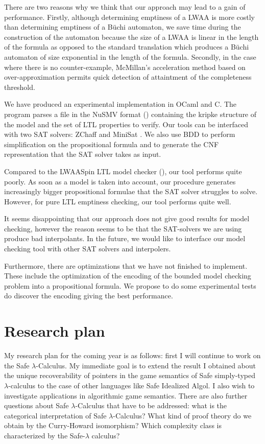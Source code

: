 There are two reasons why we think that our approach may lead to a
gain of performance. Firstly, although determining emptiness of a
LWAA is more costly than determining emptiness of a B\"uchi
automaton, we save time during the construction of the automaton
because the size of a LWAA is linear in the length of the formula as
opposed to the standard translation which produces a B\"uchi
automaton of size exponential in the length of the formula.
Secondly, in the case where there is no counter-example, McMillan's
acceleration method based on over-approximation permits quick
detection of attaintment of the completeness threshold.


We have produced an experimental implementation in OCaml and C. The
program parses a file in the NuSMV format (\cite{CAV02:nusmv})
containing the kripke structure of the model and the set of LTL
properties to verify. Our tools can be interfaced with two SAT
solvers: ZChaff \citep{zChaff} and MiniSat \citep{ES03}. We also use
BDD to perform simplification on the propositional formula and to
generate the CNF representation that the SAT solver takes as input.

Compared to the LWAASpin LTL model checker (\cite{hammer:truly}),
our tool performs quite poorly. As soon as a model is taken into
account, our procedure generates increasingly bigger propositional
formulae that the SAT solver struggles to solve. However, for pure
LTL emptiness checking, our tool performs quite well.

It seems disappointing that our approach does not give good results
for model checking, however the reason seems to be that the
SAT-solvers we are using produce bad interpolants. In the future, we
would like to interface our model checking tool with other SAT
solvers and interpolers.

Furthermore, there are optimizations that we have not finished to
implement. These include the optimization of the encoding of the
bounded model checking problem into a propositional formula. We
propose to do some experimental tests do discover the encoding
giving the best performance.

\chapter{Research plan}

My research plan for the coming year is as follows: first I will
continue to work on the Safe $\lambda$-Calculus. My immediate goal
is to extend the result I obtained about the unique recoverability
of pointers in the game semantics of Safe simply-typed
$\lambda$-calculus to the case of other languages like Safe
Idealized Algol. I also wish to investigate applications in
algorithmic game semantics. There are also further questions about
Safe $\lambda$-Calculus that have to be addressed: what is the
categorical interpretation of Safe $\lambda$-Calculus? What kind of
proof theory do we obtain by the Curry-Howard isomorphism? Which
complexity class is characterized by the Safe-$\lambda$ calculus?

